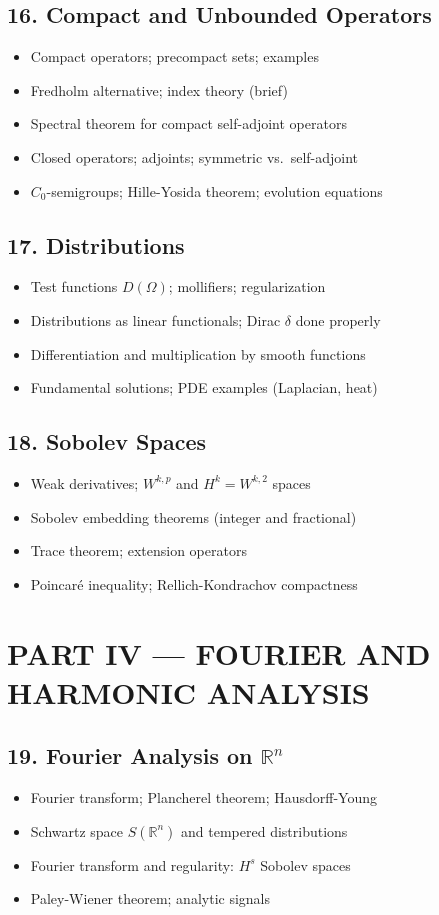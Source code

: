 \subsection{16. Compact and Unbounded Operators}
\begin{itemize}
\item Compact operators; precompact sets; examples
\item Fredholm alternative; index theory (brief)
\item Spectral theorem for compact self-adjoint operators
\item Closed operators; adjoints; symmetric vs.\ self-adjoint
\item $C_0$-semigroups; Hille-Yosida theorem; evolution equations
\end{itemize}

\subsection{17. Distributions}
\begin{itemize}
\item Test functions $D(\Omega)$; mollifiers; regularization
\item Distributions as linear functionals; Dirac $\delta$ done properly
\item Differentiation and multiplication by smooth functions
\item Fundamental solutions; PDE examples (Laplacian, heat)
\end{itemize}

\subsection{18. Sobolev Spaces}
\begin{itemize}
\item Weak derivatives; $W^{k,p}$ and $H^k = W^{k,2}$ spaces
\item Sobolev embedding theorems (integer and fractional)
\item Trace theorem; extension operators
\item Poincar\'e inequality; Rellich-Kondrachov compactness
\end{itemize}

\section{PART IV --- FOURIER AND HARMONIC ANALYSIS}

\subsection{19. Fourier Analysis on $\mathbb{R}^n$}
\begin{itemize}
\item Fourier transform; Plancherel theorem; Hausdorff-Young
\item Schwartz space $S(\mathbb{R}^n)$ and tempered distributions
\item Fourier transform and regularity: $H^s$ Sobolev spaces
\item Paley-Wiener theorem; analytic signals
\end{itemize}

